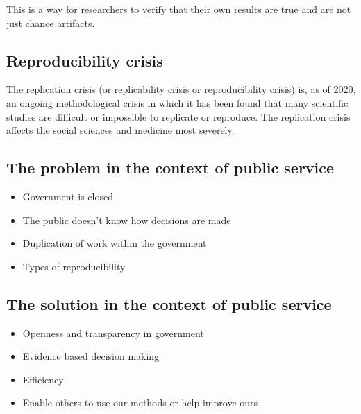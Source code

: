 \documentclass[
  12pt,
]{book}
\providecommand{\tightlist}{%
  \setlength{\itemsep}{0pt}\setlength{\parskip}{0pt}}
\begin{document}
This is a way for researchers to verify that their own results are true and are not just chance artifacts.

\hypertarget{reproducibility-crisis}{%
\subsection{Reproducibility crisis}\label{reproducibility-crisis}}

The replication crisis (or replicability crisis or reproducibility crisis) is, as of 2020, an ongoing methodological crisis in which it has been found that many scientific studies are difficult or impossible to replicate or reproduce. The replication crisis affects the social sciences and medicine most severely.

\hypertarget{the-problem-in-the-context-of-public-service}{%
\subsection{The problem in the context of public service}\label{the-problem-in-the-context-of-public-service}}

\begin{itemize}
\tightlist
\item
  Government is closed\\
\item
  The public doesn't know how decisions are made
\item
  Duplication of work within the government
\item
  Types of reproducibility
\end{itemize}

\hypertarget{the-solution-in-the-context-of-public-service}{%
\subsection{The solution in the context of public service}\label{the-solution-in-the-context-of-public-service}}

\begin{itemize}
\tightlist
\item
  Openness and transparency in government\\
\item
  Evidence based decision making\\
\item
  Efficiency\\
\item
  Enable others to use our methods or help improve ours
\end{itemize}
\end{document}
